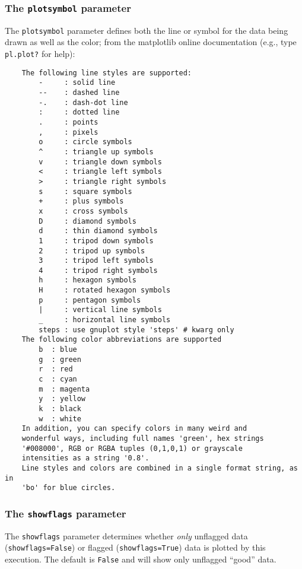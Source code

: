 \subsubsection{ The {\tt plotsymbol} parameter}
\label{section:edit.plot.plotxy.symb}

The {\tt plotsymbol} parameter defines both the line or
symbol for the data being drawn as well as the color; from the
matplotlib online documentation (e.g., type {\tt pl.plot?} for help):

\small
\begin{verbatim}
    The following line styles are supported:
        -     : solid line
        --    : dashed line
        -.    : dash-dot line
        :     : dotted line
        .     : points
        ,     : pixels
        o     : circle symbols
        ^     : triangle up symbols
        v     : triangle down symbols
        <     : triangle left symbols
        >     : triangle right symbols
        s     : square symbols
        +     : plus symbols
        x     : cross symbols
        D     : diamond symbols
        d     : thin diamond symbols
        1     : tripod down symbols
        2     : tripod up symbols
        3     : tripod left symbols
        4     : tripod right symbols
        h     : hexagon symbols
        H     : rotated hexagon symbols
        p     : pentagon symbols
        |     : vertical line symbols
        _     : horizontal line symbols
        steps : use gnuplot style 'steps' # kwarg only
    The following color abbreviations are supported
        b  : blue
        g  : green
        r  : red
        c  : cyan
        m  : magenta
        y  : yellow
        k  : black
        w  : white
    In addition, you can specify colors in many weird and
    wonderful ways, including full names 'green', hex strings
    '#008000', RGB or RGBA tuples (0,1,0,1) or grayscale
    intensities as a string '0.8'.
    Line styles and colors are combined in a single format string, as in
    'bo' for blue circles.
\end{verbatim}
\normalsize

\subsubsection{ The {\tt showflags} parameter}
\label{section:edit.plot.plotxy.showflags}

The {\tt showflags} parameter determines whether {\em only} unflagged
data ({\tt showflags=False}) or flagged ({\tt showflags=True}) data is
plotted by this execution.  The default is {\tt False} and will show
only unflagged ``good'' data.

